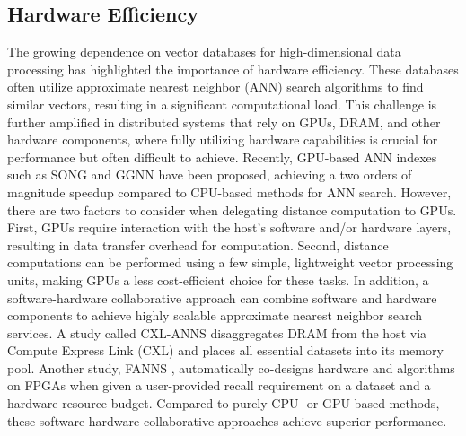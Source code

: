\documentclass[11pt]{article}
\begin{document}

\subsection{Hardware Efficiency}
The growing dependence on vector databases for high-dimensional data processing has highlighted the importance of hardware efficiency. These databases often utilize approximate nearest neighbor (ANN) search algorithms to find similar vectors, resulting in a significant computational load. This challenge is further amplified in distributed systems that rely on GPUs, DRAM, and other hardware components, where fully utilizing hardware capabilities is crucial for performance but often difficult to achieve.
Recently, GPU-based ANN indexes such as SONG \cite{DBLP:conf/icde/ZhaoTL20} and GGNN \cite{DBLP:journals/tbd/GrohRWL23} have been proposed, achieving a two orders of magnitude speedup compared to CPU-based methods for ANN search. However, there are two factors to consider when delegating distance computation to GPUs. First, GPUs require interaction with the host's software and/or hardware layers, resulting in data transfer overhead for computation. Second, distance computations can be performed using a few simple, lightweight vector processing units, making GPUs a less cost-efficient choice for these tasks.
In addition, a software-hardware collaborative approach can combine software and hardware components to achieve highly scalable approximate nearest neighbor search services. A study called CXL-ANNS \cite{DBLP:conf/usenix/JangCBLKJ23} disaggregates DRAM from the host via Compute Express Link (CXL) and places all essential datasets into its memory pool. Another study, FANNS \cite{DBLP:journals/corr/abs-2306-11182}, automatically co-designs hardware and algorithms on FPGAs when given a user-provided recall requirement on a dataset and a hardware resource budget. Compared to purely CPU- or GPU-based methods, these software-hardware collaborative approaches achieve superior performance.
\end{document}
